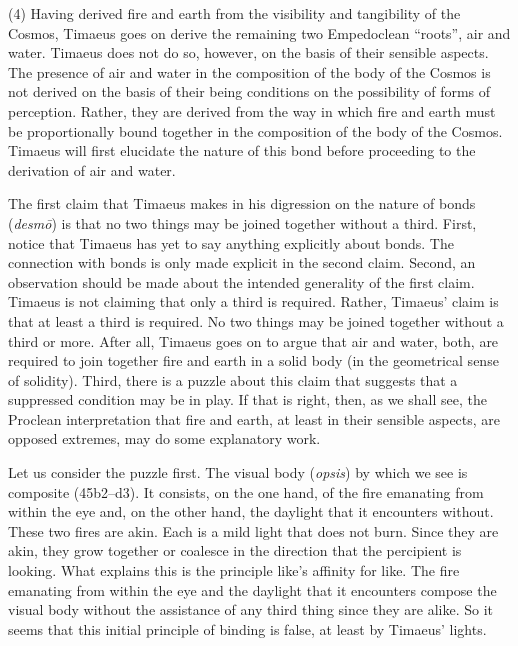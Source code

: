 (4) Having derived fire and earth from the visibility and tangibility of the Cosmos, Timaeus goes on derive the remaining two Empedoclean ``roots'', air and water. Timae\-us does not do so, however, on the basis of their sensible aspects. The presence of air and water in the composition of the body of the Cosmos is not derived on the basis of their being conditions on the possibility of forms of perception. Rather, they are derived from the way in which fire and earth must be proportionally bound together in the composition of the body of the Cosmos. Timaeus will first elucidate the nature of this bond before proceeding to the derivation of air and water.

The first claim that Timaeus makes in his digression on the nature of bonds (\emph{desmō}) is that no two things may be joined together without a third. First, notice that Timaeus has yet to say anything explicitly about bonds. The connection with bonds is only made explicit in the second claim. Second, an observation should be made about the intended generality of the first claim. Timaeus is not claiming that only a third is required. Rather, Timaeus' claim is that at least a third is required. No two things may be joined together without a third or more. After all, Timaeus goes on to argue that air and water, both, are required to join together fire and earth in a solid body (in the geometrical sense of solidity). Third, there is a puzzle about this claim that suggests that a suppressed condition may be in play. If that is right, then, as we shall see, the Proclean interpretation that fire and earth, at least in their sensible aspects, are opposed extremes, may do some explanatory work.

Let us consider the puzzle first. The visual body (\emph{opsis}) by which we see is composite (45b2--d3). It consists, on the one hand, of the fire emanating from within the eye and, on the other hand, the daylight that it encounters without. These two fires are akin. Each is a mild light that does not burn. Since they are akin, they grow together or coalesce in the direction that the percipient is looking. What explains this is the principle like's affinity for like. The fire emanating from within the eye and the daylight that it encounters compose the visual body without the assistance of any third thing since they are alike. So it seems that this initial principle of binding is false, at least by Timaeus' lights.

